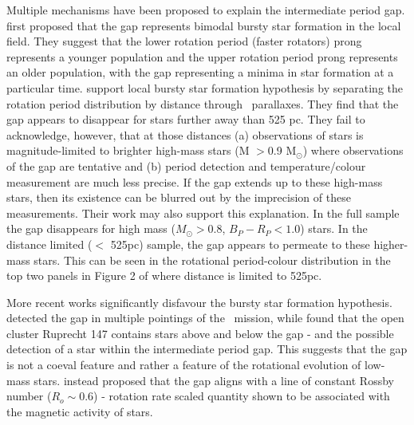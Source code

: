 Multiple mechanisms have been proposed to explain the intermediate period gap.
\citet{mcquillan_rotation_2014} first proposed that the gap represents bimodal bursty star formation in the local \kepler field.
They suggest that the lower rotation period (faster rotators) prong represents a younger population and the upper rotation period prong represents an older population, with the gap representing a minima in star formation at a particular time.
\citet{davenport_rotating_2018} support local bursty star formation hypothesis by separating the \kepler{} rotation period distribution by distance through \gaia{} \ parallaxes.
They find that the gap appears to disappear for stars further away than 525 pc.
They fail to acknowledge, however, that at those distances (a) observations of stars is magnitude-limited to brighter high-mass stars (M $>$0.9 M$_{\odot}$) where observations of the gap are tentative and (b) period detection and temperature/colour measurement are much less precise.
If the gap extends up to these high-mass stars, then its existence can be blurred out by the imprecision of these measurements.
Their work may also support this explanation.
In the full \citep{mcquillan_rotation_2014} sample the gap disappears for high mass ($M_{\odot} > 0.8$, $B_P - R_P < 1.0$) stars.
In the distance limited ($<$ 525pc) sample, the gap appears to permeate to these higher-mass stars. 
This can be seen in the rotational period-colour distribution in the top two panels in Figure 2 of \citet{davenport_rotating_2018} where distance is limited to 525pc.

More recent works significantly disfavour the bursty star formation hypothesis.
\citet{gordon_stellar_2021} detected the gap in multiple pointings of the \ktoo \ mission, while \citet{curtis_when_2020} found that the open cluster Ruprecht 147 contains stars above and below the gap - and the possible detection of a star within the intermediate period gap.
This suggests that the gap is not a coeval feature and rather a feature of the rotational evolution of low-mass stars.
\citet{curtis_when_2020} instead proposed that the gap aligns with a line of constant Rossby number ($R_o\sim 0.6$) - rotation rate scaled quantity shown to be associated with the magnetic activity of stars.

